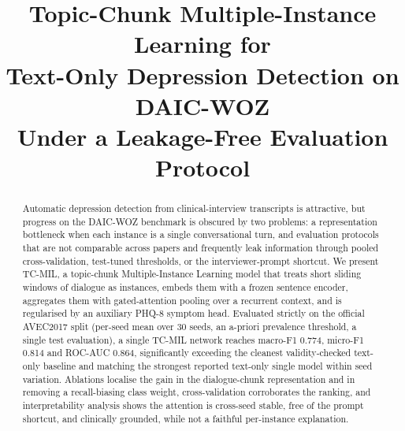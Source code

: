 \documentclass[conference]{IEEEtran}
\begin{document}
\title{Topic-Chunk Multiple-Instance Learning for\\Text-Only Depression
Detection on DAIC-WOZ\\Under a Leakage-Free Evaluation Protocol}

\author{
\and
{}
}

\maketitle

\begin{abstract}
Automatic depression detection from clinical-interview transcripts is
attractive, but progress on the DAIC-WOZ benchmark is obscured by two problems:
a representation bottleneck when each instance is a single conversational turn,
and evaluation protocols that are not comparable across papers and frequently
leak information through pooled cross-validation, test-tuned thresholds, or the
interviewer-prompt shortcut. We present TC-MIL, a topic-chunk Multiple-Instance
Learning model that treats short sliding windows of dialogue as instances,
embeds them with a frozen sentence encoder, aggregates them with gated-attention
pooling over a recurrent context, and is regularised by an auxiliary PHQ-8
symptom head. Evaluated strictly on the official AVEC2017 split (per-seed mean
over 30 seeds, an a-priori prevalence threshold, a single test evaluation), a
single TC-MIL network reaches macro-F1 0.774, micro-F1 0.814 and ROC-AUC 0.864,
significantly exceeding the cleanest validity-checked text-only baseline and
matching the strongest reported text-only single model within seed variation. Ablations localise the gain in the dialogue-chunk
representation and in removing a recall-biasing class weight, cross-validation
corroborates the ranking, and interpretability analysis shows the attention is
cross-seed stable, free of the prompt shortcut, and clinically grounded, while
not a faithful per-instance explanation.
\end{abstract}
\end{document}
